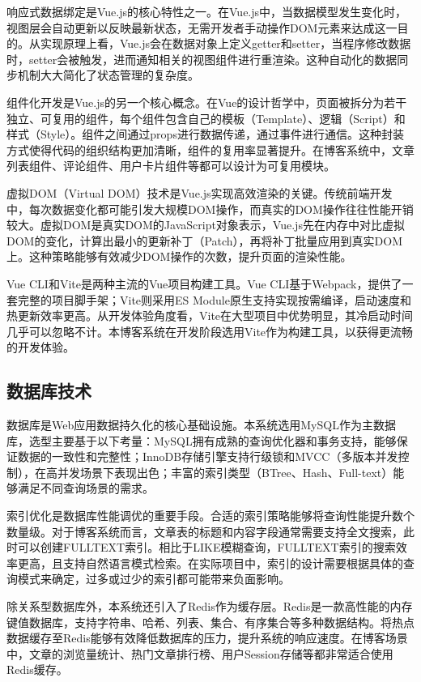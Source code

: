 \documentclass[UTF8,AutoFakeBold=1,AutoFakeSlant,zihao=-4]{SCAU}
\begin{document}
 响应式数据绑定是Vue.js的核心特性之一。在Vue.js中，当数据模型发生变化时，视图层会自动更新以反映最新状态，无需开发者手动操作DOM元素来达成这一目的。从实现原理上看，Vue.js会在数据对象上定义getter和setter，当程序修改数据时，setter会被触发，进而通知相关的视图组件进行重渲染。这种自动化的数据同步机制大大简化了状态管理的复杂度。

 组件化开发是Vue.js的另一个核心概念。在Vue的设计哲学中，页面被拆分为若干独立、可复用的组件，每个组件包含自己的模板（Template）、逻辑（Script）和样式（Style）。组件之间通过props进行数据传递，通过事件进行通信。这种封装方式使得代码的组织结构更加清晰，组件的复用率显著提升。在博客系统中，文章列表组件、评论组件、用户卡片组件等都可以设计为可复用模块。

 虚拟DOM（Virtual DOM）技术是Vue.js实现高效渲染的关键。传统前端开发中，每次数据变化都可能引发大规模DOM操作，而真实的DOM操作往往性能开销较大。虚拟DOM是真实DOM的JavaScript对象表示，Vue.js先在内存中对比虚拟DOM的变化，计算出最小的更新补丁（Patch），再将补丁批量应用到真实DOM上。这种策略能够有效减少DOM操作的次数，提升页面的渲染性能。

 Vue CLI和Vite是两种主流的Vue项目构建工具。Vue CLI基于Webpack，提供了一套完整的项目脚手架；Vite则采用ES Module原生支持实现按需编译，启动速度和热更新效率更高。从开发体验角度看，Vite在大型项目中优势明显，其冷启动时间几乎可以忽略不计。本博客系统在开发阶段选用Vite作为构建工具，以获得更流畅的开发体验。

 \subsection{数据库技术}

 数据库是Web应用数据持久化的核心基础设施。本系统选用MySQL作为主数据库，选型主要基于以下考量：MySQL拥有成熟的查询优化器和事务支持，能够保证数据的一致性和完整性；InnoDB存储引擎支持行级锁和MVCC（多版本并发控制），在高并发场景下表现出色；丰富的索引类型（BTree、Hash、Full-text）能够满足不同查询场景的需求。

 索引优化是数据库性能调优的重要手段。合适的索引策略能够将查询性能提升数个数量级。对于博客系统而言，文章表的标题和内容字段通常需要支持全文搜索，此时可以创建FULLTEXT索引。相比于LIKE模糊查询，FULLTEXT索引的搜索效率更高，且支持自然语言模式检索。在实际项目中，索引的设计需要根据具体的查询模式来确定，过多或过少的索引都可能带来负面影响。

 除关系型数据库外，本系统还引入了Redis作为缓存层。Redis是一款高性能的内存键值数据库，支持字符串、哈希、列表、集合、有序集合等多种数据结构。将热点数据缓存至Redis能够有效降低数据库的压力，提升系统的响应速度。在博客场景中，文章的浏览量统计、热门文章排行榜、用户Session存储等都非常适合使用Redis缓存。
\end{document}
